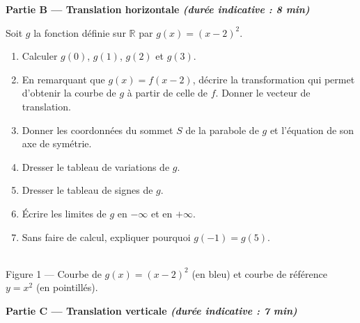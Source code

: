 \documentclass[11pt,a4paper]{article}
\newcommand{\R}{\mathbb{R}}
\newcommand{\partie}[2]{%
  \vspace{6pt}
  \noindent\colorbox{blue!12}{\parbox{\dimexpr\linewidth-2\fboxsep}{%
    \bfseries\color{blue!50!black} #1 \hfill \normalfont\small\itshape (durée indicative : #2)}}%
  \vspace{4pt}}
\begin{document}
\partie{Partie B — Translation horizontale}{8 min}

Soit $g$ la fonction définie sur $\R$ par $g(x)=(x-2)^2$.

\begin{enumerate}[leftmargin=1.4em,itemsep=3pt]
  \item Calculer $g(0)$, $g(1)$, $g(2)$ et $g(3)$.

  \item En remarquant que $g(x)=f(x-2)$, décrire la transformation qui permet d'obtenir la courbe de $g$
  à partir de celle de $f$. Donner le vecteur de translation.

  \item Donner les coordonnées du sommet $S$ de la parabole de $g$ et l'équation de son axe de symétrie.

  \item Dresser le tableau de variations de $g$.

  \item Dresser le tableau de signes de $g$.

  \item Écrire les limites de $g$ en $-\infty$ et en $+\infty$.

  \item Sans faire de calcul, expliquer pourquoi $g(-1)=g(5)$.
\end{enumerate}

\begin{center}
\\[-2pt]
{\small Figure 1 — Courbe de $g(x)=(x-2)^2$ (en bleu) et courbe de référence $y=x^2$ (en pointillés).}
\end{center}

\partie{Partie C — Translation verticale}{7 min}
\end{document}
